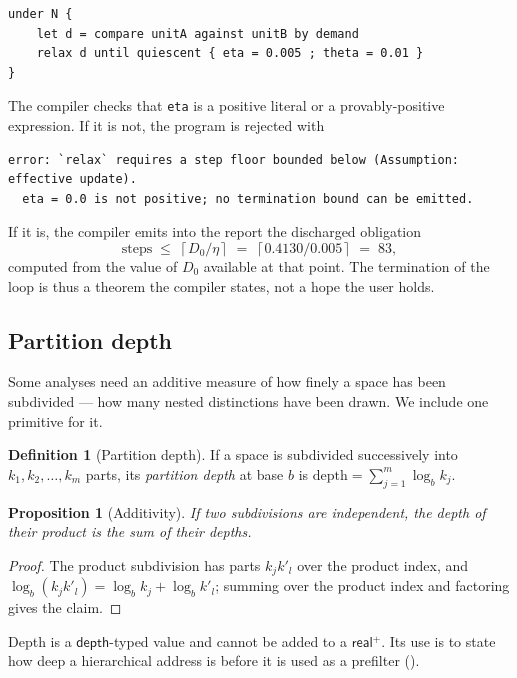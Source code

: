 \documentclass[11pt,twocolumn,a4paper]{article}
\theoremstyle{plain}
\newtheorem{proposition}[theorem]{Proposition}
\theoremstyle{definition}
\newtheorem{definition}[theorem]{Definition}
\theoremstyle{remark}
\newcommand{\dem}{D}
\newcommand{\typ}[1]{\ensuremath{\mathsf{#1}}}
\begin{document}
\begin{lstlisting}[style=nonum]
under N {
    let d = compare unitA against unitB by demand
    relax d until quiescent { eta = 0.005 ; theta = 0.01 }
}
\end{lstlisting}

The compiler checks that \texttt{eta} is a positive literal or a
provably-positive expression. If it is not, the program is rejected with

\begin{lstlisting}[style=grammar]
error: `relax` requires a step floor bounded below (Assumption: effective update).
  eta = 0.0 is not positive; no termination bound can be emitted.
\end{lstlisting}

\noindent If it is, the compiler emits into the report the discharged
obligation
\[
  \text{steps} \;\le\; \left\lceil \dem_0/\eta \right\rceil
  \;=\; \left\lceil 0.4130/0.005 \right\rceil \;=\; 83 ,
\]
computed from the value of $\dem_0$ available at that point. The
termination of the loop is thus a theorem the compiler states, not a
hope the user holds.

\subsection{Partition depth}
\label{sec:depth}

Some analyses need an additive measure of how finely a space has been
subdivided --- how many nested distinctions have been drawn. We include
one primitive for it.

\begin{definition}[Partition depth]
\label{def:depth}
If a space is subdivided successively into $k_1,k_2,\dots,k_m$ parts,
its \emph{partition depth} at base $b$ is
$\mathrm{depth} = \sum_{j=1}^{m}\log_b k_j$.
\end{definition}

\begin{proposition}[Additivity]
\label{prop:depthadd}
If two subdivisions are independent, the depth of their product is the
sum of their depths.
\end{proposition}
\begin{proof}
The product subdivision has parts $k_j k'_l$ over the product index, and
$\log_b(k_jk'_l)=\log_b k_j+\log_b k'_l$; summing over the product
index and factoring gives the claim.
\end{proof}

Depth is a \typ{depth}-typed value and cannot be added to a
\typ{real}$^+$. Its use is to state how deep a hierarchical address is
before it is used as a prefilter ().
\end{document}
